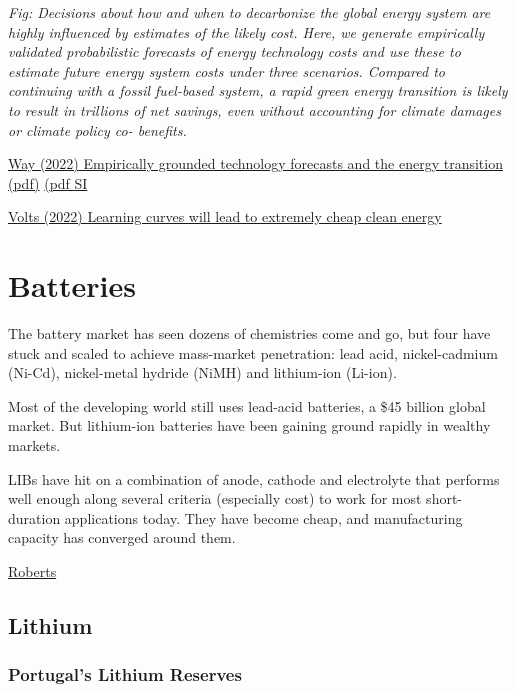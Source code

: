 \documentclass[
]{book}
\begin{document}
\emph{Fig: Decisions about how and when to decarbonize the global energy system are highly
influenced by estimates of the likely cost. Here, we generate empirically validated
probabilistic forecasts of energy technology costs and use these to estimate future
energy system costs under three scenarios. Compared to continuing with a fossil
fuel-based system, a rapid green energy transition is likely to result in trillions of net
savings, even without accounting for climate damages or climate policy co-
benefits.}

\href{https://www.cell.com/joule/fulltext/S2542-4351(22)00410-X}{Way (2022) Empirically grounded technology forecasts and the energy transition}
\href{pdf/Way_2022_Empirically_grounded_Technology_forcasts_Energy_Transition.pdf}{(pdf)}
\href{pdf/Way_2022_Empirically_grounded_Technology_forcasts_Energy_Transition_SI.pdf}{(pdf SI}

\href{https://www.volts.wtf/p/learning-curves-will-lead-to-extremely\#details}{Volts (2022) Learning curves will lead to extremely cheap clean energy}

\hypertarget{batteries}{%
\chapter{Batteries}\label{batteries}}

The battery market has seen dozens of chemistries come and go, but four have stuck and scaled to achieve mass-market penetration: lead acid, nickel-cadmium (Ni-Cd), nickel-metal hydride (NiMH) and lithium-ion (Li-ion).

Most of the developing world still uses lead-acid batteries, a \$45 billion global market. But lithium-ion batteries have been gaining ground rapidly in wealthy markets.

LIBs have hit on a combination of anode, cathode and electrolyte that performs well enough along several criteria (especially cost) to work for most short-duration applications today. They have become cheap, and manufacturing capacity has converged around them.

\href{https://www.canarymedia.com/articles/the-basics-of-how-lithium-ion-batteries-work/}{Roberts}

\hypertarget{lithium}{%
\section{Lithium}\label{lithium}}

\hypertarget{portugals-lithium-reserves}{%
\subsection{Portugal's Lithium Reserves}\label{portugals-lithium-reserves}}
\end{document}
